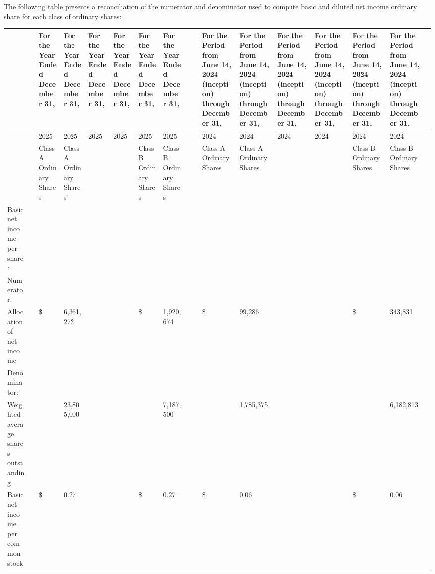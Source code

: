 \documentclass[11pt,a4paper]{article}
\begin{document}
The following table presents a reconciliation of the numerator and denominator used to compute basic and diluted net income ordinary share for each class of ordinary shares:

\begin{table}[h]
\begin{tabular}{|l|l|l|l|l|l|l|l|l|l|l|l|l|l|l|l|l|}
\hline
 &  & For the Year Ended December 31, & For the Year Ended December 31, & For the Year Ended December 31, & For the Year Ended December 31, & For the Year Ended December 31, & For the Year Ended December 31, &  &  & For the Period from June 14, 2024 (inception) through December 31, & For the Period from June 14, 2024 (inception) through December 31, & For the Period from June 14, 2024 (inception) through December 31, & For the Period from June 14, 2024 (inception) through December 31, & For the Period from June 14, 2024 (inception) through December 31, & For the Period from June 14, 2024 (inception) through December 31, &  \\ \hline
 &  & 2025 & 2025 & 2025 & 2025 & 2025 & 2025 &  &  & 2024 & 2024 & 2024 & 2024 & 2024 & 2024 &  \\ \hline
 &  & Class A Ordinary Shares & Class A Ordinary Shares &  &  & Class B Ordinary Shares & Class B Ordinary Shares &  &  & Class A Ordinary Shares & Class A Ordinary Shares &  &  & Class B Ordinary Shares & Class B Ordinary Shares &  \\ \hline
Basic net income per share: &  &  &  &  &  &  &  &  &  &  &  &  &  &  &  &  \\ \hline
Numerator: &  &  &  &  &  &  &  &  &  &  &  &  &  &  &  &  \\ \hline
Allocation of net income &  & \$ & 6,361,272 &  &  & \$ & 1,920,674 &  &  & \$ & 99,286 &  &  & \$ & 343,831 &  \\ \hline
Denominator: &  &  &  &  &  &  &  &  &  &  &  &  &  &  &  &  \\ \hline
Weighted-average shares outstanding &  &  & 23,805,000 &  &  &  & 7,187,500 &  &  &  & 1,785,375 &  &  &  & 6,182,813 &  \\ \hline
Basic net income per common stock &  & \$ & 0.27 &  &  & \$ & 0.27 &  &  & \$ & 0.06 &  &  & \$ & 0.06 &  \\ \hline
\end{tabular}
\end{table}
\end{document}
